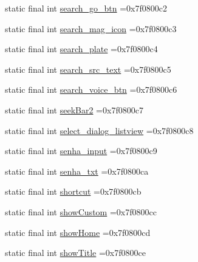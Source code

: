 \begin{DoxyCompactItemize}
\item 
static final int \mbox{\hyperlink{classbr_1_1unb_1_1cic_1_1mp_1_1marketmaster_1_1R_1_1id_a31d9c95e3f5c257d76996c74339ba690}{search\+\_\+go\+\_\+btn}} =0x7f0800c2
\item 
static final int \mbox{\hyperlink{classbr_1_1unb_1_1cic_1_1mp_1_1marketmaster_1_1R_1_1id_ada71bb2035b23e096b24334b59fdf078}{search\+\_\+mag\+\_\+icon}} =0x7f0800c3
\item 
static final int \mbox{\hyperlink{classbr_1_1unb_1_1cic_1_1mp_1_1marketmaster_1_1R_1_1id_a1a707551233d7a3d71e290fcf04dfccf}{search\+\_\+plate}} =0x7f0800c4
\item 
static final int \mbox{\hyperlink{classbr_1_1unb_1_1cic_1_1mp_1_1marketmaster_1_1R_1_1id_a09ea37110ac16cef14af9510f68027f3}{search\+\_\+src\+\_\+text}} =0x7f0800c5
\item 
static final int \mbox{\hyperlink{classbr_1_1unb_1_1cic_1_1mp_1_1marketmaster_1_1R_1_1id_ade542b8bc45fd11b63552dce921d069f}{search\+\_\+voice\+\_\+btn}} =0x7f0800c6
\item 
static final int \mbox{\hyperlink{classbr_1_1unb_1_1cic_1_1mp_1_1marketmaster_1_1R_1_1id_a6d3f3ea1f5bfa97dacbb9a4d2b85b0bb}{seek\+Bar2}} =0x7f0800c7
\item 
static final int \mbox{\hyperlink{classbr_1_1unb_1_1cic_1_1mp_1_1marketmaster_1_1R_1_1id_ace0ba311888059fdd2e6fbc0af6e67c3}{select\+\_\+dialog\+\_\+listview}} =0x7f0800c8
\item 
static final int \mbox{\hyperlink{classbr_1_1unb_1_1cic_1_1mp_1_1marketmaster_1_1R_1_1id_a5a94aa60ff9b567342ac4a4b126917dd}{senha\+\_\+input}} =0x7f0800c9
\item 
static final int \mbox{\hyperlink{classbr_1_1unb_1_1cic_1_1mp_1_1marketmaster_1_1R_1_1id_a7e30fa310fd1a601744ff9d1994d15db}{senha\+\_\+txt}} =0x7f0800ca
\item 
static final int \mbox{\hyperlink{classbr_1_1unb_1_1cic_1_1mp_1_1marketmaster_1_1R_1_1id_a4a48cc24cb91b402acf4115617cfae00}{shortcut}} =0x7f0800cb
\item 
static final int \mbox{\hyperlink{classbr_1_1unb_1_1cic_1_1mp_1_1marketmaster_1_1R_1_1id_aeaffc914feb3e1bd00bb8ebaca11d424}{show\+Custom}} =0x7f0800cc
\item 
static final int \mbox{\hyperlink{classbr_1_1unb_1_1cic_1_1mp_1_1marketmaster_1_1R_1_1id_a1a7f391c9b212d710fab43d8bdceb943}{show\+Home}} =0x7f0800cd
\item 
static final int \mbox{\hyperlink{classbr_1_1unb_1_1cic_1_1mp_1_1marketmaster_1_1R_1_1id_ad15e5fae38f7827dd64f1d3a169cd801}{show\+Title}} =0x7f0800ce

\end{DoxyCompactItemize}
